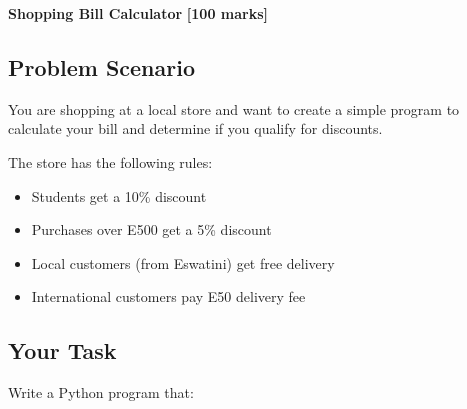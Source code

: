 \documentclass[a4paper,11pt]{article}
\theoremstyle{mytheor}
\begin{document}
\textbf{Shopping Bill Calculator} \hfill \textbf{[100 marks]}

\subsection*{Problem Scenario}

You are shopping at a local store and want to create a simple program to calculate your bill and determine if you qualify for discounts.

The store has the following rules:
\begin{itemize}
    \item Students get a 10\% discount
    \item Purchases over E500 get a 5\% discount
    \item Local customers (from Eswatini) get free delivery
    \item International customers pay E50 delivery fee
\end{itemize}

\subsection*{Your Task}

Write a Python program that:
\end{document}
